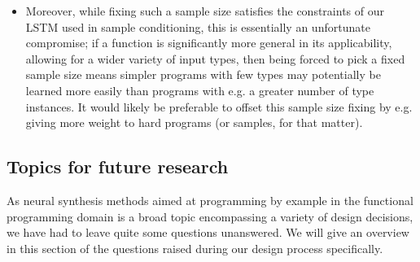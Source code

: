 \documentclass{article}
\begin{document}
\begin{itemize}
    \item
    Moreover, while fixing such a sample size satisfies the constraints of our LSTM used in sample conditioning,
    this is essentially an unfortunate compromise;
    if a function is significantly more general in its applicability,
    allowing for a wider variety of input types,
    then being forced to pick a fixed sample size means simpler programs with few types may potentially be learned more easily than programs with e.g. a greater number of type instances.
    It would likely be preferable to offset this sample size fixing by e.g. giving more weight to hard programs (or samples, for that matter).

\end{itemize}

\subsection{Topics for future research}

As neural synthesis methods aimed at programming by example in the functional
programming domain is a broad topic encompassing a variety of design decisions,
we have had to leave quite some questions unanswered.
We will give an overview in this section of the questions raised during our design process specifically.

\end{document}
